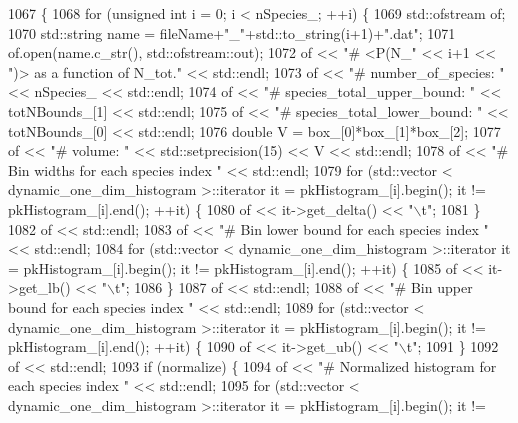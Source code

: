 \begin{DoxyCode}
1067                                                                                 \{
1068     \textcolor{keywordflow}{for} (\textcolor{keywordtype}{unsigned} \textcolor{keywordtype}{int} i = 0; i < nSpecies\_; ++i) \{
1069         std::ofstream of;
1070         std::string name = fileName+\textcolor{stringliteral}{"\_"}+std::to\_string(i+1)+\textcolor{stringliteral}{".dat"};
1071         of.open(name.c\_str(), std::ofstream::out);
1072         of << \textcolor{stringliteral}{"# <P(N\_"} << i+1 << \textcolor{stringliteral}{")> as a function of N\_tot."} << std::endl;
1073         of << \textcolor{stringliteral}{"# number\_of\_species: "} << nSpecies\_ << std::endl;
1074         of << \textcolor{stringliteral}{"# species\_total\_upper\_bound: "} << totNBounds\_[1] << std::endl;
1075         of << \textcolor{stringliteral}{"# species\_total\_lower\_bound: "} << totNBounds\_[0] << std::endl;
1076         \textcolor{keywordtype}{double} V = box\_[0]*box\_[1]*box\_[2];
1077         of << \textcolor{stringliteral}{"# volume: "} << std::setprecision(15) << V << std::endl;
1078         of << \textcolor{stringliteral}{"# Bin widths for each species index "} << std::endl;
1079         \textcolor{keywordflow}{for} (std::vector < dynamic\_one\_dim\_histogram >::iterator it = pkHistogram\_[i].begin(); it != 
      pkHistogram\_[i].end(); ++it) \{
1080             of << it->get\_delta() << \textcolor{stringliteral}{"\(\backslash\)t"};
1081         \}
1082         of << std::endl;
1083         of << \textcolor{stringliteral}{"# Bin lower bound for each species index "} << std::endl;
1084         \textcolor{keywordflow}{for} (std::vector < dynamic\_one\_dim\_histogram >::iterator it = pkHistogram\_[i].begin(); it != 
      pkHistogram\_[i].end(); ++it) \{
1085             of << it->get\_lb() << \textcolor{stringliteral}{"\(\backslash\)t"};
1086         \}
1087         of << std::endl;
1088         of << \textcolor{stringliteral}{"# Bin upper bound for each species index "} << std::endl;
1089         \textcolor{keywordflow}{for} (std::vector < dynamic\_one\_dim\_histogram >::iterator it = pkHistogram\_[i].begin(); it != 
      pkHistogram\_[i].end(); ++it) \{
1090             of << it->get\_ub() << \textcolor{stringliteral}{"\(\backslash\)t"};
1091         \}
1092         of << std::endl;
1093         \textcolor{keywordflow}{if} (normalize) \{
1094             of << \textcolor{stringliteral}{"# Normalized histogram for each species index "} << std::endl;
1095             \textcolor{keywordflow}{for} (std::vector < dynamic\_one\_dim\_histogram >::iterator it = pkHistogram\_[i].begin(); it != 

\end{DoxyCode}
